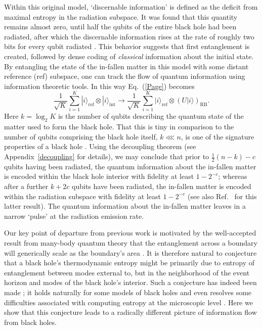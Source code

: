 \documentclass[aps,prl,amsmath,amssymb,floatfix,12pt]{revtex4}
\begin{document}
Within this original model, `discernable information' is defined as
the deficit from maximal entropy in the radiation subspace. It was
found that this quantity remains almost zero, until half the qubits
of the entire black hole had been radiated, after which the discernable
information rises at the rate of roughly two bits for every qubit
radiated \cite{Page93}. This behavior suggests that first entanglement
is created, followed by dense coding \cite{Bennett92} of {\it classical\/}
information about the initial state. By entangling the state of the
in-fallen matter in this model with some distant reference (ref) subspace,
one can track the flow of quantum information using information
theoretic tools. In this way Eq.~(\ref{Page}) becomes \cite{Hayden07}
\begin{equation}
\frac{1}{\sqrt{K}}\sum_{i=1}^{K}
|i\rangle_{\text{ref}}\otimes|i\rangle_{\text{int}}\rightarrow
\frac{1}{\sqrt{K}}\sum_{i=1}^{K}
|i\rangle_{\text{ref}}\otimes(U|i\rangle)_{\text{RB}}.
\label{HaydenPreskill}
\end{equation}
Here $k=\log_2 K$ is the number of qubits describing the quantum state
of the matter used to form the black hole. That this is tiny in
comparison to the number of qubits comprising the black hole itself,
$k\lll n$, is one of the signature properties of a black
hole \cite{tHooft93}. Using the decoupling theorem \cite{Abey06} (see
Appendix~\ref{decoupling} for details), we may conclude that prior to
$\frac{1}{2}(n-k)-c$ qubits having been radiated, the quantum information
about the in-fallen matter is encoded within the black hole interior
with fidelity at least $1-2^{-c}$; whereas after a further $k + 2c$
qubits have been radiated, the in-fallen matter is encoded within
the radiation subspace with fidelity at least $1-2^{-c}$ (see also
Ref.~ for this latter result). The quantum
information about the in-fallen matter leaves in a narrow `pulse'
at the radiation emission rate.

Our key point of departure from previous work is motivated by the
well-accepted result from many-body quantum theory that the
entanglement across a boundary will generically scale as the
boundary's area \cite{Eisert09}. It is therefore natural to conjecture
that a black hole's thermodynamic entropy might be primarily due to
entropy of entanglement between modes external to, but in the
neighborhood of the event horizon and modes of the black hole's
interior. Such a conjecture has indeed been made
\cite{tHooft85,Bombelli86,Srednicki93,Hawking01,Brustein06,Emparan06};
it holds naturally for some models of black holes \cite{Hawking01,Brustein06}
and even resolves some difficulties associated with computing entropy at
the microscopic level \cite{Emparan06}. Here we show that this conjecture
leads to a radically different picture of information flow from black
holes.
\end{document}
